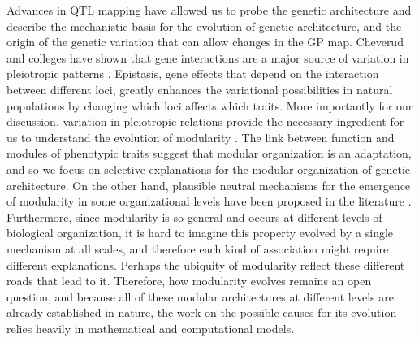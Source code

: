 \begin{refsection}
Advances in QTL mapping have allowed us to probe the genetic
architecture and describe the mechanistic basis for the evolution of
genetic architecture, and the origin of the genetic variation that can
allow changes in the GP map. Cheverud and colleges have shown that gene
interactions are a major source of variation in pleiotropic patterns
\parencite{Wolf2005-nr, Pavlicev2008-jy}. Epistasis, gene effects that
depend on the interaction between different loci, greatly enhances the
variational possibilities in natural populations by changing which loci
affects which traits. More importantly for our discussion, variation in
pleiotropic relations provide the necessary ingredient for us to
understand the evolution of modularity \parencite{Wagner1996-ui}. The link
between function and modules of phenotypic traits suggest that modular
organization is an adaptation, and so we focus on selective explanations
for the modular organization of genetic architecture. On the other hand,
plausible neutral mechanisms for the emergence of modularity in some
organizational levels have been proposed in the literature
\parencite{Wagner2007-cx, Lynch2007-kz}. Furthermore, since modularity is so
general and occurs at different levels of biological organization, it is
hard to imagine this property evolved by a single mechanism at all
scales, and therefore each kind of association might require different
explanations. Perhaps the ubiquity of modularity reflect these different
roads that lead to it. Therefore, how modularity evolves remains an open
question, and because all of these modular architectures at different
levels are already established in nature, the work on the possible
causes for its evolution relies heavily in mathematical and
computational models.


\end{refsection}
